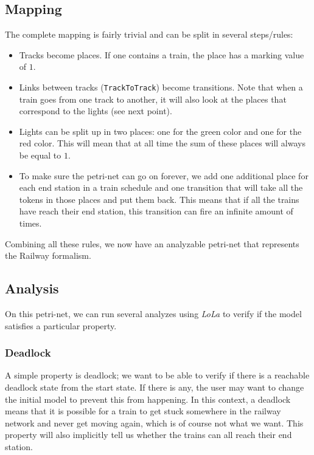 \documentclass{article}
\begin{document}
\subsection{Mapping}
\label{petri-net_mapping}

The complete mapping is fairly trivial and can be split in several steps/rules:

\begin{itemize}
    \item Tracks become places. If one contains a train, the place has a marking value of $1$.
    \item Links between tracks (\texttt{TrackToTrack}) become transitions. Note that when a train goes from one track to another, it will also look at the places that correspond to the lights (see next point).
    \item Lights can be split up in two places: one for the green color and one for the red color. This will mean that at all time the sum of these places will always be equal to $1$.
    \item To make sure the petri-net can go on forever, we add one additional place for each end station in a train schedule and one transition that will take all the tokens in those places and put them back. This means that if all the trains have reach their end station, this transition can fire an infinite amount of times.
\end{itemize}

Combining all these rules, we now have an analyzable petri-net that represents the Railway formalism.

\subsection{Analysis}
\label{safety_analysis}

On this petri-net, we can run several analyzes using \textit{LoLa} to verify if the model satisfies a particular property.

\subsubsection{Deadlock}

A simple property is deadlock; we want to be able to verify if there is a reachable deadlock state from the start state. If there is any, the user may want to change the initial model to prevent this from happening. In this context, a deadlock means that it is possible for a train to get stuck somewhere in the railway network and never get moving again, which is of course not what we want. This property will also implicitly tell us whether the trains can all reach their end station.
\end{document}
